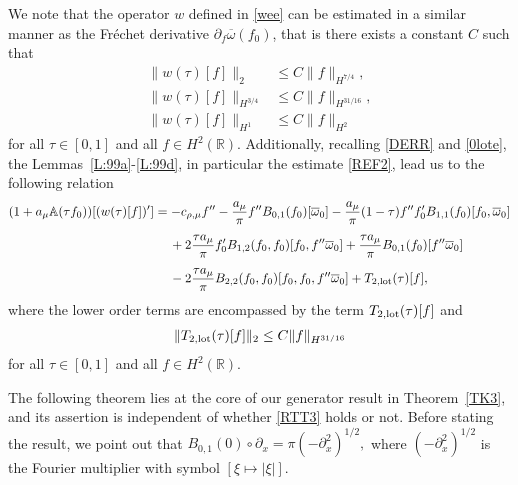 \documentclass[11pt,reqno]{amsart}
\numberwithin{equation}{section}
\newcommand{\0}{\Omega}
\newcommand{\p}{\partial}
\newcommand{\ov}{\overline}
\newcommand{\oo}{\ov\omega}
\newcommand{\bA}{\mathbb{A}}
\newcommand{\R}{\mathbb{R}}
\numberwithin{equation}{section}
\begin{document}
 We note    that the operator $w$ defined in \eqref{wee} can be estimated  in a  similar manner as the Fr\'echet derivative $\p_f\oo(f_0)$, that is
 there exists a constant $C $ such that
\begin{align}
 \|w(\tau)[f]\|_2&\leq C\|f\|_{H^{7/4}},\label{DFF1*}\\[1ex]
 \|w(\tau)[f]\|_{H^{3/4}}&\leq C\|f\|_{H^{31/16}},\label{DFF3*}\\[1ex]
   \|w(\tau)[f]\|_{H^1 }&\leq C\|f\|_{H^2}\label{DFF2*}
\end{align}
for all $\tau\in [0,1]$ and all $f\in H^2(\R)$.
Additionally, recalling \eqref{DERR} and \eqref{0lote}, the Lemmas~\ref{L:99a}-\ref{L:99d}, in particular the estimate \eqref{REF2},  lead us to the following relation 
\begin{align}
 (1+a_\mu \bA(\tau f_0))[( w(\tau)[f])']
 &=-c_{\rho,\mu}f''-\frac{a_\mu}{\pi}f''B_{0,1}(f_0)[\oo_0]-\frac{a_\mu}{\pi}(1-\tau)f''f_0'B_{1,1}(f_0)[f_0,\oo_0]\nonumber\\[1ex]
 &\hspace{0.424cm}+2\frac{\tau a_\mu}{\pi}f_0'B_{1,2}(f_0,f_0)[f_0,f''\oo_0]+\frac{\tau a_\mu}{\pi}B_{0,1}(f_0)[f''\oo_0]\nonumber\\[1ex]
 &\hspace{0.424cm}-2\frac{\tau a_\mu}{\pi}B_{2,2}(f_0,f_0)[f_0, f_0,f''\oo_0]+T_{2,{\rm lot}}(\tau)[f],\label{oto0-}
\end{align}
where   the lower order terms are encompassed by the term $T_{2,{\rm lot}}(\tau)[f]$ and
\begin{align}
   \|T_{2,{\rm lot}}(\tau)[f]\|_2\leq C\|f\|_{H^{31/16}} \label{oto0}
 \end{align}
 for all $\tau\in [0,1]$ and all $f\in H^2(\R)$.
 
 The following theorem lies at the core of our generator result in Theorem~\ref{TK3}, and its assertion is independent of whether  \eqref{RTT3} holds or not. 
 Before stating the result, we point out that $B_{0,1}(0)\circ\p_x=\pi(-\p_x^2)^{1/2}, $ where   $(-\p_x^2)^{1/2}$ is the Fourier multiplier with symbol $[\xi\mapsto |\xi|].$
\end{document}
